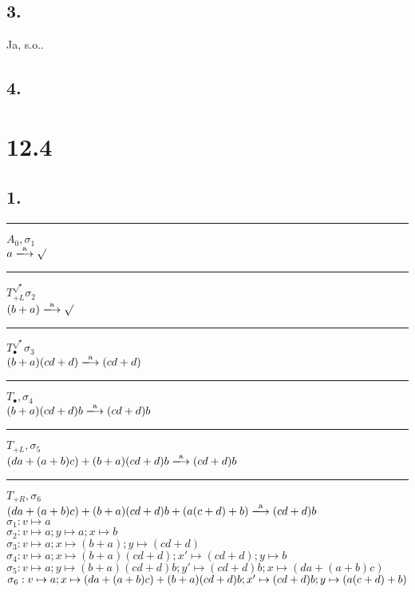 \documentclass[12pt, paper=a4]{article}
\begin{document}
\subsection*{3.}
Ja, s.o..
\subsection*{4.}

\section*{12.4}

\subsection*{1.}
\rule{1cm}{1pt} \(A_0, \sigma_1\)\\
\(a \xlongrightarrow{\text{a}} \surd\)\\
\rule{2.5cm}{1pt} \(T_{+L}^\surd, \sigma_2\)\\
\((b+a) \xlongrightarrow{\text{a}} \surd\)\\
\rule{5cm}{1pt} \(T_{\bullet}^\surd, \sigma_3\)\\
\((b+a)(cd+d) \xlongrightarrow{\text{a}} (cd+d)\)\\
\rule{5.5cm}{1pt} \(T_{\bullet}, \sigma_4\)\\
\((b+a)(cd+d)b \xlongrightarrow{\text{a}} (cd+d)b\)\\
\rule{8.5cm}{1pt} \(T_{+L}, \sigma_5\)\\
\((da+(a+b)c)+(b+a)(cd+d)b \xlongrightarrow{\text{a}} (cd+d)b\)\\
\rule{11.5cm}{1pt} \(T_{+R}, \sigma_6\)\\
\((da+(a+b)c)+(b+a)(cd+d)b+(a(c+d)+b) \xlongrightarrow{\text{a}} (cd+d)b\)\\

\(\sigma_1: v \mapsto a\)\\
\(\sigma_2: v \mapsto a; y \mapsto a; x \mapsto b\)\\
\(\sigma_3: v \mapsto a; x \mapsto (b+a); y \mapsto (cd+d)\)\\
\(\sigma_4: v \mapsto a; x \mapsto (b+a)(cd+d); x' \mapsto (cd+d); y \mapsto b\)\\
\(\sigma_5: v \mapsto a; y \mapsto (b+a)(cd+d)b; y' \mapsto (cd+d)b; x \mapsto (da+(a+b)c)\)\\
\(\sigma_6: v \mapsto a; x \mapsto (da+(a+b)c)+(b+a)(cd+d)b; x' \mapsto (cd+d)b; \\ y \mapsto (a(c+d)+b)\)\\
\end{document}
